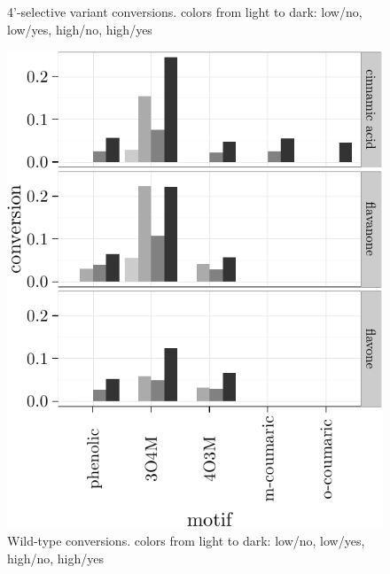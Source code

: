 \documentclass[]{tufte-handout}
\begin{document}
\begin{figure}
\caption{4'-selective variant conversions. colors from light to dark: low/no, low/yes, high/no, high/yes}
\end{figure}\begin{figure}
 \includegraphics{tufte_files/figure-latex/unnamed-chunk-14-4.pdf}
\caption{Wild-type conversions. colors from light to dark: low/no, low/yes, high/no, high/yes}
\end{figure}
\end{document}
